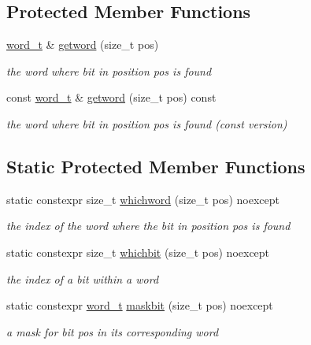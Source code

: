 \subsection*{Protected Member Functions}
\begin{DoxyCompactItemize}
\item 
\mbox{\hyperlink{classforte_1_1_bit_array_a7f3b4ebbbe4bc80ce60cc6614cb565da}{word\+\_\+t}} \& \mbox{\hyperlink{classforte_1_1_bit_array_aecfc8a774fcde14d6f458208d658988e}{getword}} (size\+\_\+t pos)
\begin{DoxyCompactList}\small\item\em the word where bit in position pos is found \end{DoxyCompactList}\item 
const \mbox{\hyperlink{classforte_1_1_bit_array_a7f3b4ebbbe4bc80ce60cc6614cb565da}{word\+\_\+t}} \& \mbox{\hyperlink{classforte_1_1_bit_array_afd7eda3840661bf37fc587c1374e9bc8}{getword}} (size\+\_\+t pos) const
\begin{DoxyCompactList}\small\item\em the word where bit in position pos is found (const version) \end{DoxyCompactList}\end{DoxyCompactItemize}
\subsection*{Static Protected Member Functions}
\begin{DoxyCompactItemize}
\item 
static constexpr size\+\_\+t \mbox{\hyperlink{classforte_1_1_bit_array_a4da96fee16fe9fbad29d58bced1b13d1}{whichword}} (size\+\_\+t pos) noexcept
\begin{DoxyCompactList}\small\item\em the index of the word where the bit in position pos is found \end{DoxyCompactList}\item 
static constexpr size\+\_\+t \mbox{\hyperlink{classforte_1_1_bit_array_a10682d9d2a6a947f9a001af6bc3239d7}{whichbit}} (size\+\_\+t pos) noexcept
\begin{DoxyCompactList}\small\item\em the index of a bit within a word \end{DoxyCompactList}\item 
static constexpr \mbox{\hyperlink{classforte_1_1_bit_array_a7f3b4ebbbe4bc80ce60cc6614cb565da}{word\+\_\+t}} \mbox{\hyperlink{classforte_1_1_bit_array_aed63ad4064fdbd25e8d3878767a25e54}{maskbit}} (size\+\_\+t pos) noexcept
\begin{DoxyCompactList}\small\item\em a mask for bit pos in its corresponding word \end{DoxyCompactList}\end{DoxyCompactItemize}
